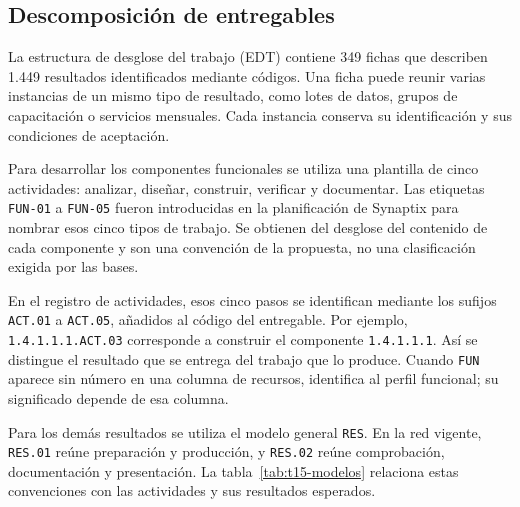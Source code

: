 \subsection{Descomposición de entregables}
La estructura de desglose del trabajo (EDT) contiene 349 fichas que describen 1.449 resultados identificados mediante códigos. Una ficha puede reunir varias instancias de un mismo tipo de resultado, como lotes de datos, grupos de capacitación o servicios mensuales. Cada instancia conserva su identificación y sus condiciones de aceptación.

Para desarrollar los componentes funcionales se utiliza una plantilla de cinco actividades: analizar, diseñar, construir, verificar y documentar. Las etiquetas \texttt{FUN-01} a \texttt{FUN-05} fueron introducidas en la planificación de Synaptix para nombrar esos cinco tipos de trabajo. Se obtienen del desglose del contenido de cada componente y son una convención de la propuesta, no una clasificación exigida por las bases.

En el registro de actividades, esos cinco pasos se identifican mediante los sufijos \texttt{ACT.01} a \texttt{ACT.05}, añadidos al código del entregable. Por ejemplo, \texttt{1.4.1.1.1.ACT.03} corresponde a construir el componente \texttt{1.4.1.1.1}. Así se distingue el resultado que se entrega del trabajo que lo produce. Cuando \texttt{FUN} aparece sin número en una columna de recursos, identifica al perfil funcional; su significado depende de esa columna.

Para los demás resultados se utiliza el modelo general \texttt{RES}. En la red vigente, \texttt{RES.01} reúne preparación y producción, y \texttt{RES.02} reúne comprobación, documentación y presentación. La tabla~\ref{tab:t15-modelos} relaciona estas convenciones con las actividades y sus resultados esperados.

